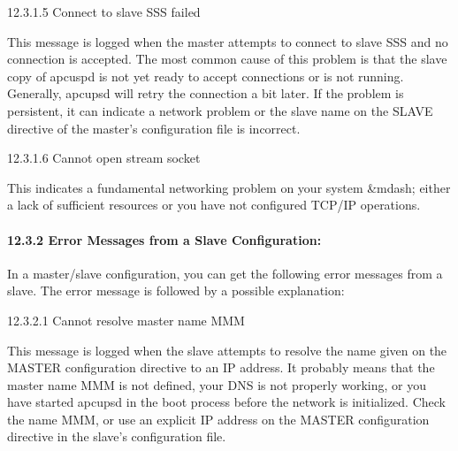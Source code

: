 {\small12.3.1.5 Connect to slave SSS failed}

This message is logged when the master attempts to connect to slave SSS and no
connection is accepted. The most common cause of this problem is that the
slave copy of apcuspd is not yet ready to accept connections or is not
running. Generally, apcupsd will retry the connection a bit later. If the
problem is persistent, it can indicate a network problem or the slave name on
the SLAVE directive of the master's configuration file is incorrect. 

\label{Cannot-open-stream-socket}

{\small12.3.1.6 Cannot open stream socket}

This indicates a fundamental networking problem on your system \&mdash; either
a lack of sufficient resources or you have not configured TCP/IP operations. 

\label{Error-Messages-from-a-Slave-Configuration}

\paragraph*{12.3.2 Error Messages from a Slave Configuration:}

In a master/slave configuration, you can get the following error messages from
a slave. The error message is followed by a possible explanation: 

\label{Cannot-resolve-master-name-MMM}

{\small12.3.2.1 Cannot resolve master name MMM}

This message is logged when the slave attempts to resolve the name given on
the MASTER configuration directive to an IP address. It probably means that
the master name MMM is not defined, your DNS is not properly working, or you
have started apcupsd in the boot process before the network is initialized.
Check the name MMM, or use an explicit IP address on the MASTER configuration
directive in the slave's configuration file. 

\label{Cannot-bind-local-address_003b-probably-already-in-use}

